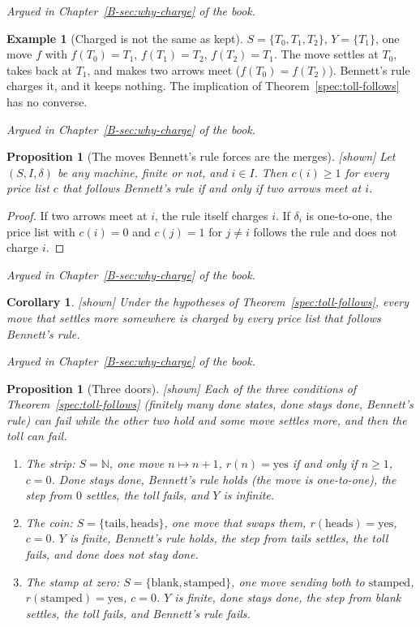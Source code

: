 \documentclass[11pt, a4paper]{article}
\theoremstyle{plain}
\newtheorem{proposition}[theorem]{Proposition}
\newtheorem{corollary}[theorem]{Corollary}
\theoremstyle{definition}
\newtheorem{example}[theorem]{Example}
\theoremstyle{remark}
\newcommand{\N}{\mathbb{N}}
\newcommand{\step}{\delta}
\newcommand{\cost}{c}
\newcommand{\rd}{r}
\newcommand{\argued}[1]{\par\noindent\textit{Argued in Chapter~\ref{B-#1} of the book.}\par}
\newcommand{\kind}[1]{\textup{[#1]}}
\begin{document}
\argued{sec:why-charge}

\begin{example}[Charged is not the same as kept]\label{spec:three-cards}
$S=\{T_0,T_1,T_2\}$, $Y=\{T_1\}$, one move $f$ with $f(T_0)=T_1$, $f(T_1)=T_2$, $f(T_2)=T_1$. The move
settles at $T_0$, takes back at $T_1$, and makes two arrows meet ($f(T_0)=f(T_2)$). Bennett's rule
charges it, and it keeps nothing. The implication of Theorem~\ref{spec:toll-follows} has no converse.
\end{example}

\argued{sec:why-charge}

\begin{proposition}[The moves Bennett's rule forces are the merges]\label{spec:forced} \kind{shown}
Let $(S,I,\step)$ be any machine, finite or not, and $i\in I$. Then $\cost(i)\ge1$ for every price list
$\cost$ that follows Bennett's rule if and only if two arrows meet at $i$.
\end{proposition}

\begin{proof}
If two arrows meet at $i$, the rule itself charges $i$. If $\step_i$ is one-to-one, the price list with
$\cost(i)=0$ and $\cost(j)=1$ for $j\ne i$ follows the rule and does not charge $i$.
\end{proof}

\argued{sec:why-charge}

\begin{corollary}\label{spec:forced-kept} \kind{shown}
Under the hypotheses of Theorem~\ref{spec:toll-follows}, every move that settles more somewhere is
charged by every price list that follows Bennett's rule.
\end{corollary}

\argued{sec:why-charge}

\begin{proposition}[Three doors]\label{spec:three-doors} \kind{shown}
Each of the three conditions of Theorem~\ref{spec:toll-follows} (finitely many done states, done stays
done, Bennett's rule) can fail while the other two hold and some move settles more, and then the toll
can fail.
\begin{enumerate}[label=(\alph*)]
\item The strip: $S=\N$, one move $n\mapsto n+1$, $\rd(n)=\mathrm{yes}$ if and only if $n\ge1$,
$\cost=0$. Done stays done, Bennett's rule holds (the move is one-to-one), the step from $0$ settles,
the toll fails, and $Y$ is infinite.
\item The coin: $S=\{\mathrm{tails},\mathrm{heads}\}$, one move that swaps them,
$\rd(\mathrm{heads})=\mathrm{yes}$, $\cost=0$. $Y$ is finite, Bennett's rule holds, the step from tails
settles, the toll fails, and done does not stay done.
\item The stamp at zero: $S=\{\mathrm{blank},\mathrm{stamped}\}$, one move sending both to
$\mathrm{stamped}$, $\rd(\mathrm{stamped})=\mathrm{yes}$, $\cost=0$. $Y$ is finite, done stays done, the
step from blank settles, the toll fails, and Bennett's rule fails.
\end{enumerate}
\end{proposition}
\end{document}
